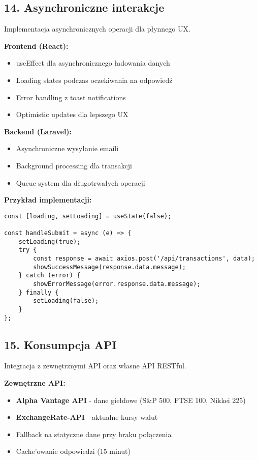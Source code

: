\subsection{14. Asynchroniczne interakcje}

Implementacja asynchronicznych operacji dla płynnego UX.

\textbf{Frontend (React):}
\begin{itemize}
    \item useEffect dla asynchronicznego ładowania danych
    \item Loading states podczas oczekiwania na odpowiedź
    \item Error handling z toast notifications
    \item Optimistic updates dla lepszego UX
\end{itemize}

\textbf{Backend (Laravel):}
\begin{itemize}
    \item Asynchroniczne wysyłanie emaili
    \item Background processing dla transakcji
    \item Queue system dla długotrwałych operacji
\end{itemize}

\textbf{Przykład implementacji:}
\begin{verbatim}
const [loading, setLoading] = useState(false);

const handleSubmit = async (e) => {
    setLoading(true);
    try {
        const response = await axios.post('/api/transactions', data);
        showSuccessMessage(response.data.message);
    } catch (error) {
        showErrorMessage(error.response.data.message);
    } finally {
        setLoading(false);
    }
};
\end{verbatim}

\subsection{15. Konsumpcja API}

Integracja z zewnętrznymi API oraz własne API RESTful.

\textbf{Zewnętrzne API:}
\begin{itemize}
    \item \textbf{Alpha Vantage API} - dane giełdowe (S\&P 500, FTSE 100, Nikkei 225)
    \item \textbf{ExchangeRate-API} - aktualne kursy walut
    \item Fallback na statyczne dane przy braku połączenia
    \item Cache'owanie odpowiedzi (15 minut)
\end{itemize}

